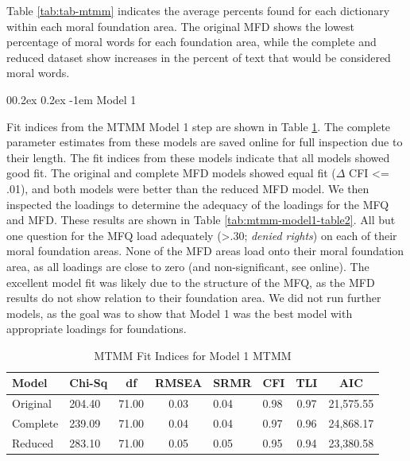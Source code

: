 \documentclass[
  man,floatsintext]{apa6}
\makeatletter
\let\oldparagraph\paragraph
\renewcommand{\paragraph}{
    \@ifstar
      \xxxParagraphStar
      \xxxParagraphNoStar
  }
\newcommand{\xxxParagraphStar}[1]{\oldparagraph*{#1}\mbox{}}
\newcommand{\xxxParagraphNoStar}[1]{\oldparagraph{#1}\mbox{}}
\renewcommand{\paragraph}{\@startsection{paragraph}{4}{\parindent}%
  {0\baselineskip \@plus 0.2ex \@minus 0.2ex}%
  {-1em}%
  {\normalfont\normalsize\bfseries\itshape\typesectitle}}
\makeatother
\begin{document}
Table \ref{tab:tab-mtmm} indicates the average percents found for each dictionary within each moral foundation area. The original MFD shows the lowest percentage of moral words for each foundation area, while the complete and reduced dataset show increases in the percent of text that would be considered moral words.

\paragraph{Model 1}\label{model-1}

Fit indices from the MTMM Model 1 step are shown in Table \ref{tab:mtmm-model1-table}. The complete parameter estimates from these models are saved online for full inspection due to their length. The fit indices from these models indicate that all models showed good fit. The original and complete MFD models showed equal fit (\(\Delta\) CFI \textless= .01), and both models were better than the reduced MFD model. We then inspected the loadings to determine the adequacy of the loadings for the MFQ and MFD. These results are shown in Table \ref{tab:mtmm-model1-table2}. All but one question for the MFQ load adequately (\textgreater.30; \emph{denied rights}) on each of their moral foundation areas. None of the MFD areas load onto their moral foundation area, as all loadings are close to zero (and non-significant, see online). The excellent model fit was likely due to the structure of the MFQ, as the MFD results do not show relation to their foundation area. We did not run further models, as the goal was to show that Model 1 was the best model with appropriate loadings for foundations.

\begin{table}[ht]

\begin{center}
\begin{threeparttable}

\caption{\label{tab:mtmm-model1-table}MTMM Fit Indices for Model 1 MTMM}

\footnotesize{

\begin{tabular}{llccllcc}
\toprule
Model & Chi-Sq & df & RMSEA & SRMR & CFI & TLI & AIC\\
\midrule
Original & 204.40 & 71.00 & 0.03 & 0.04 & 0.98 & 0.97 & 21,575.55\\
Complete & 239.09 & 71.00 & 0.04 & 0.04 & 0.97 & 0.96 & 24,868.17\\
Reduced & 283.10 & 71.00 & 0.05 & 0.05 & 0.95 & 0.94 & 23,380.58\\
\bottomrule
\end{tabular}

}

\end{threeparttable}
\end{center}

\end{table}
\end{document}
